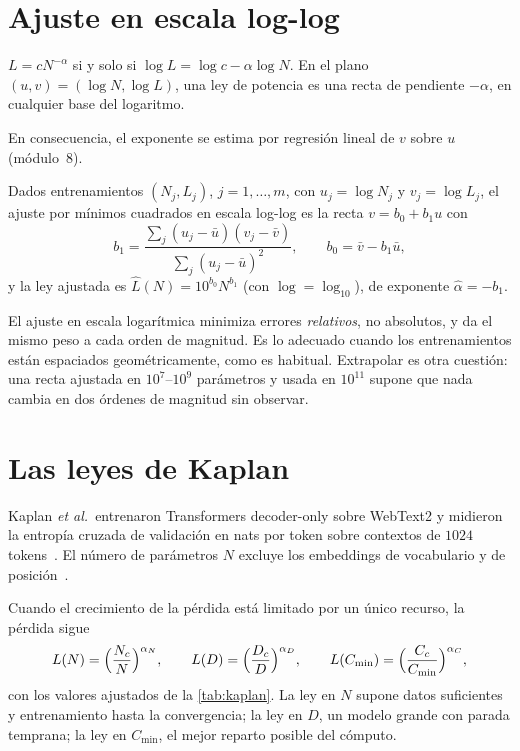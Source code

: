 \section{Ajuste en escala log-log}

\begin{proposicion}\label{prop:loglog}
$L=cN^{-\alpha}$ si y solo si $\log L=\log c-\alpha\log N$. En el plano $(u,v)=(\log N,\log L)$, una ley de potencia es una recta de pendiente $-\alpha$, en cualquier base del logaritmo.
\end{proposicion}

En consecuencia, el exponente se estima por regresión lineal de $v$ sobre $u$ (módulo~8).

\begin{definicion}\label{def:ajuste}
Dados entrenamientos $(N_j,L_j)$, $j=1,\dots,m$, con $u_j=\log N_j$ y $v_j=\log L_j$, el ajuste por mínimos cuadrados en escala log-log es la recta $v=b_0+b_1u$ con
\[
b_1=\frac{\sum_j(u_j-\bar u)(v_j-\bar v)}{\sum_j(u_j-\bar u)^{2}},\qquad b_0=\bar v-b_1\bar u,
\]
y la ley ajustada es $\hat L(N)=10^{b_0}N^{b_1}$ (con $\log=\log_{10}$), de exponente $\hat\alpha=-b_1$.
\end{definicion}

\begin{observacion}
El ajuste en escala logarítmica minimiza errores \emph{relativos}, no absolutos, y da el mismo peso a cada orden de magnitud. Es lo adecuado cuando los entrenamientos están espaciados geométricamente, como es habitual. Extrapolar es otra cuestión: una recta ajustada en $10^{7}$--$10^{9}$ parámetros y usada en $10^{11}$ supone que nada cambia en dos órdenes de magnitud sin observar.
\end{observacion}

\section{Las leyes de Kaplan}

Kaplan \emph{et al.}\ entrenaron Transformers decoder-only sobre WebText2 y midieron la entropía cruzada de validación en nats por token sobre contextos de $1024$ tokens~\cite[§2]{kaplan}. El número de parámetros $N$ excluye los embeddings de vocabulario y de posición~\cite[§1.3]{kaplan}.

\begin{definicion}\label{def:kaplan}
Cuando el crecimiento de la pérdida está limitado por un único recurso, la pérdida sigue~\cite[ecuaciones~(1.1)--(1.3)]{kaplan}
\[
L(N)=\Bigl(\frac{N_c}{N}\Bigr)^{\alpha_N},\qquad
L(D)=\Bigl(\frac{D_c}{D}\Bigr)^{\alpha_D},\qquad
L(C_{\min})=\Bigl(\frac{C_c}{C_{\min}}\Bigr)^{\alpha_C},
\]
con los valores ajustados de la \cref{tab:kaplan}. La ley en $N$ supone datos suficientes y entrenamiento hasta la convergencia; la ley en $D$, un modelo grande con parada temprana; la ley en $C_{\min}$, el mejor reparto posible del cómputo.
\end{definicion}

